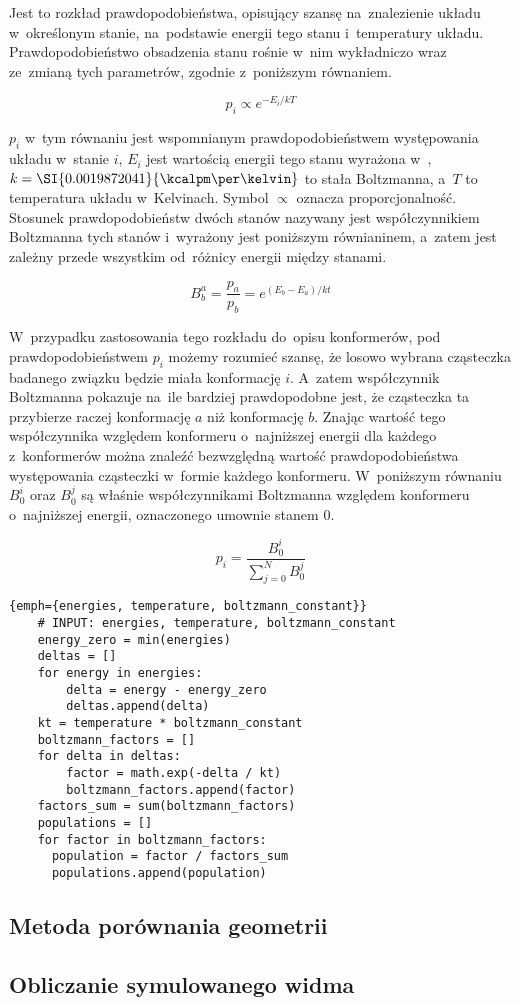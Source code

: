 Jest to rozkład prawdopodobieństwa, opisujący szansę na~znalezienie układu w~określonym stanie,
  na~podstawie energii tego stanu i~temperatury układu.
Prawdopodobieństwo obsadzenia stanu rośnie w~nim wykładniczo wraz ze~zmianą tych parametrów,
  zgodnie z~poniższym równaniem.

\begin{equation}
  p_i \propto e^{-E_i/kT}
\end{equation}

$p_i$ w~tym równaniu jest wspomnianym prawdopodobieństwem występowania układu w~stanie $i$,
  $E_i$ jest wartością energii tego stanu wyrażona w~\si{\kcalpm},
  $k = \SI{0.0019872041}{\kcalpm\per\kelvin}$ to stała Boltzmanna,
  a~$T$ to temperatura układu w~Kelvinach.
Symbol $\propto$ oznacza proporcjonalność.
Stosunek prawdopodobieństw dwóch stanów nazywany jest współczynnikiem Boltzmanna tych stanów
  i~wyrażony jest poniższym równianinem, a~zatem jest zależny przede wszystkim od~różnicy
  energii między stanami.

\begin{equation}
  B^a_b = \frac{p_a}{p_b} = e^{(E_b-E_a)/kt}
\end{equation}

W~przypadku zastosowania tego rozkładu do~opisu konformerów, pod prawdopodobieństwem $p_i$
  możemy rozumieć szansę, że losowo wybrana cząsteczka badanego związku będzie miała
  konformację $i$.
A~zatem współczynnik Boltzmanna pokazuje na~ile bardziej prawdopodobne jest, że cząsteczka
  ta przybierze raczej konformację $a$ niż konformację $b$.
Znając wartość tego współczynnika względem konformeru o~najniższej energii dla każdego
  z~konformerów można znaleźć bezwzględną wartość prawdopodobieństwa występowania cząsteczki
  w~formie każdego konformeru.
W~poniższym równaniu $B^i_0$ oraz $B^j_0$ są właśnie współczynnikami Boltzmanna względem
  konformeru o~najniższej energii, oznaczonego umownie stanem $0$.

\begin{equation}
  p_i = \frac{B^i_0}{\sum^N_{j=0}B^j_0}
\end{equation}

\begin{listing}
  \begin{lstlisting}{emph={energies, temperature, boltzmann_constant}}
    # INPUT: energies, temperature, boltzmann_constant
    energy_zero = min(energies)
    deltas = []
    for energy in energies:
        delta = energy - energy_zero
        deltas.append(delta)
    kt = temperature * boltzmann_constant
    boltzmann_factors = []
    for delta in deltas:
        factor = math.exp(-delta / kt)
        boltzmann_factors.append(factor)
    factors_sum = sum(boltzmann_factors)
    populations = []
    for factor in boltzmann_factors:
      population = factor / factors_sum
      populations.append(population)
  \end{lstlisting}
\end{listing}

\subsection{Metoda porównania geometrii}\label{implementation:rmsd}
\subsection{Obliczanie symulowanego widma}\label{implementation:spectra}
